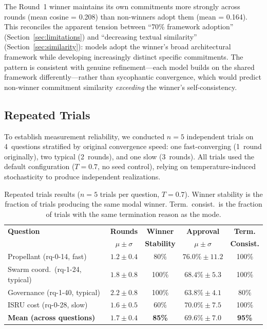 \documentclass[11pt,a4paper]{article}
\begin{document}
The Round~1 winner maintains its own commitments more strongly across rounds (mean cosine = 0.208) than non-winners adopt them (mean = 0.164). This reconciles the apparent tension between ``70\% framework adoption'' (Section~\ref{sec:limitations}) and ``decreasing textual similarity'' (Section~\ref{sec:similarity}): models adopt the winner's broad architectural framework while developing increasingly distinct specific commitments. The pattern is consistent with genuine refinement---each model builds on the shared framework differently---rather than sycophantic convergence, which would predict non-winner commitment similarity \emph{exceeding} the winner's self-consistency.

\subsection{Repeated Trials}
\label{sec:repeated_trials}

To establish measurement reliability, we conducted $n = 5$ independent trials on 4~questions stratified by original convergence speed: one fast-converging (1~round originally), two typical (2~rounds), and one slow (3~rounds). All trials used the default configuration ($T = 0.7$, no seed control), relying on temperature-induced stochasticity to produce independent realizations.

\begin{table}[ht]
\centering
\caption{Repeated trials results ($n = 5$ trials per question, $T = 0.7$). Winner stability is the fraction of trials producing the same modal winner. Term.\ consist.\ is the fraction of trials with the same termination reason as the mode.}
\label{tab:repeated_trials}
\begin{tabular}{@{}lcccc@{}}
\toprule
\textbf{Question} & \textbf{Rounds} & \textbf{Winner} & \textbf{Approval} & \textbf{Term.} \\
 & $\mu \pm \sigma$ & \textbf{Stability} & $\mu \pm \sigma$ & \textbf{Consist.} \\
\midrule
Propellant (rq-0-14, fast) & $1.2 \pm 0.4$ & 80\% & $76.0\% \pm 11.2$ & 100\% \\
Swarm coord.\ (rq-1-24, typical) & $1.8 \pm 0.8$ & 100\% & $68.4\% \pm 5.3$ & 100\% \\
Governance (rq-1-40, typical) & $2.2 \pm 0.8$ & 100\% & $63.8\% \pm 4.1$ & 80\% \\
ISRU cost (rq-0-28, slow) & $1.6 \pm 0.5$ & 60\% & $70.0\% \pm 7.5$ & 100\% \\
\midrule
\textbf{Mean (across questions)} & $1.7 \pm 0.4$ & \textbf{85\%} & $69.6\% \pm 7.0$ & \textbf{95\%} \\
\bottomrule
\end{tabular}
\end{table}
\end{document}
